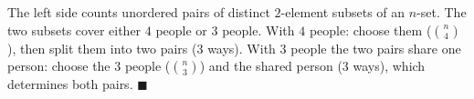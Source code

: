 The left side counts unordered pairs of distinct $2$-element subsets of an $n$-set. The two subsets cover either $4$ people or $3$ people. With $4$ people: choose them ($\binom n4$), then split them into two pairs ($3$ ways). With $3$ people the two pairs share one person: choose the $3$ people ($\binom n3$) and the shared person ($3$ ways), which determines both pairs. $\blacksquare$
